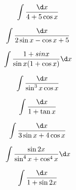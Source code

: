 \begin{question}
    \begin{equation*}
        \int \frac{\d x}{4 + 5 \cos x}
    \end{equation*}
\end{question}

\begin{question}
    \begin{equation*}
        \int \frac{\d x}{2\sin x - \cos x + 5}
    \end{equation*}
\end{question}

\begin{question}
    \begin{equation*}
        \int \frac{1 + sin x}{\sin x (1 + \cos x)} \d x
    \end{equation*}
\end{question}

\begin{question}
    \begin{equation*}
        \int \frac{\d x}{\sin^3 x \cos x}
    \end{equation*}
\end{question}

\begin{question}
    \begin{equation*}
        \int \frac{\d x}{1 + \tan x}
    \end{equation*}
\end{question}

\begin{question}
    \begin{equation*}
        \int \frac{\d x}{3\sin x + 4\cos x}
    \end{equation*}
\end{question}

\begin{question}
    \begin{equation*}
        \int \frac{\sin 2x}{\sin^4 x + \cos^4 x} \d x
    \end{equation*}
\end{question}

\begin{question}
    \begin{equation*}
        \int \frac{\d x}{1 + \sin 2x}
    \end{equation*}
\end{question}

